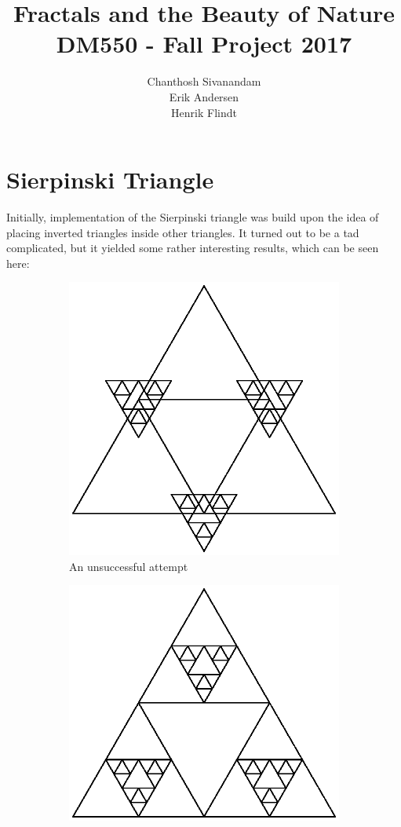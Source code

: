 \documentclass[titlepage]{article}
\author{Chanthosh Sivanandam \\ Erik Andersen \\ Henrik Flindt }
\title{Fractals and the Beauty of Nature \\ DM550 - Fall Project 2017}
\begin{document}
\maketitle
\section{Sierpinski Triangle}
Initially, implementation of the Sierpinski triangle was build upon the idea of placing inverted triangles inside other triangles. It turned out to be a tad complicated, but it yielded some rather interesting results, which can be seen here:
\begin{figure}[H]
  \centering
  \begin{subfigure}[b]{0.4\textwidth}
    \includegraphics[width=\textwidth]{wrongtriangle}
    \caption{An unsuccessful attempt}
  \end{subfigure}
  \begin{subfigure}[b]{0.5\textwidth}
    \includegraphics[width=\textwidth]{wrongtriangle2}

\end{subfigure}
\end{figure}
\end{document}
